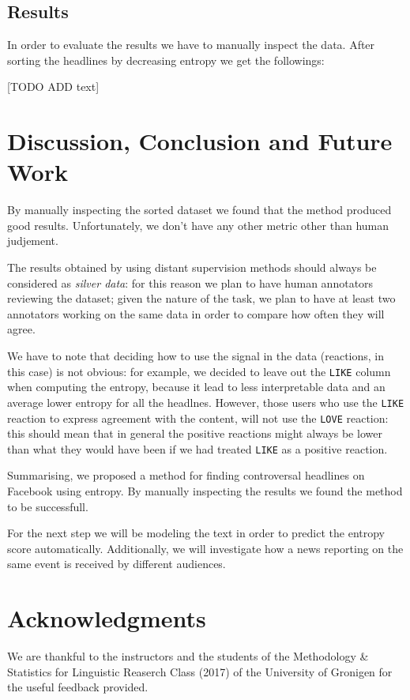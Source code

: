 \documentclass[article,11pt,nofixltx2e]{article}
\begin{document}
\subsection{Results}
\label{sec-2-5}

In order to evaluate the results we have to manually inspect the data. After sorting the headlines by decreasing entropy we get the followings:

[TODO ADD text]

\section{Discussion, Conclusion and Future Work}
\label{sec-3}


By manually inspecting the sorted dataset we found that the method produced good results. Unfortunately, we don't have any other metric other than human judjement.

The results obtained by using distant supervision methods should always be considered as \emph{silver data}: for this reason we plan to have human annotators reviewing the dataset; given the nature of the task, we plan to have at least two annotators working on the same data in order to compare how often they will agree.

We have to note that deciding how to use the signal in the data (reactions, in this case) is not obvious: for example, we decided to leave out the \texttt{LIKE} column when computing the entropy, because it lead to less interpretable data and an average lower entropy for all the headlnes. However, those users who use the \texttt{LIKE} reaction to express agreement with the content, will not use the \texttt{LOVE} reaction: this should mean that in general the positive reactions might always be lower than what they would have been if we had treated \texttt{LIKE} as a positive reaction.

Summarising, we proposed a method for finding controversal headlines on Facebook using entropy. By manually inspecting the results we found the method to be successfull.

For the next step we will be modeling the text in order to predict the entropy score automatically. Additionally, we will investigate how a news reporting on the same event is received by different audiences.

\section{Acknowledgments}
\label{sec-4}

We are thankful to the instructors and the students of the Methodology \& Statistics for Linguistic Reaserch Class (2017) of the University of Gronigen for the useful feedback provided.
\end{document}
